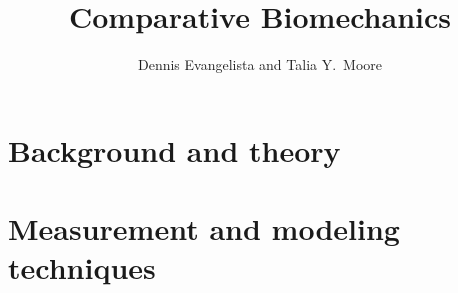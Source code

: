 \documentclass{tufte-book}
\title{Comparative Biomechanics}
\author{Dennis Evangelista and Talia Y.\ Moore}
\theoremstyle{plain}
\theoremstyle{defninition}
\theoremstyle{remark}
\begin{document}
\frontmatter
\maketitle




\tableofcontents
\listoffigures
\listoftables





\mainmatter

\part{Background and theory}


\part{Measurement and modeling techniques}


\appendix


\setcounter{secnumdepth}{-1} %
%


\pagestyle{plain}
\printindex
\end{document}
